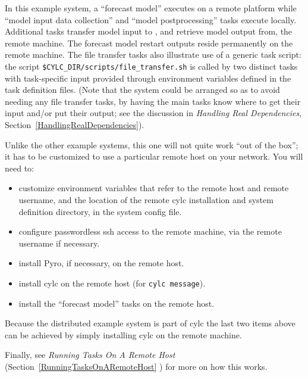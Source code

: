 \documentclass[11pt,a4paper]{article}
\begin{document}
In this example system, a ``forecast model'' executes on a remote
platform while ``model input data collection'' and ``model
postprocessing'' tasks execute locally. Additional tasks transfer model
input to , and retrieve model output from, the remote machine. The
forecast model restart outputs reside permanently on the remote machine.
The file transfer tasks also illustrate use of a generic task script:
the script \lstinline=$CYLC_DIR/scripts/file_transfer.sh= is called by
two distinct tasks with task-specific input provided through environment
variables defined in the task definition files.  (Note that the system
could be arranged so as to avoid needing any file transfer tasks, by
having the main tasks know where to get their input and/or put their
output; see the discussion in {\em Handling Real Dependencies},
Section~\ref{HandlingRealDependencies}).

Unlike the other example systems, this one will not quite work ``out of
the box''; it has to be customized to use a particular remote host on
your network. You will need to:

\begin{itemize}

    \item customize environment variables that refer to the remote 
        host and remote username, and the location of the remote 
        cylc installation and system definition directory, in the system
        config file. 

    \item configure passwordless ssh access to the remote machine,
        via the remote username if necessary.

    \item install Pyro, if necessary, on the remote host.

    \item install cylc on the remote host (for \lstinline=cylc message=).

    \item install the ``forecast model'' tasks on the remote host.

\end{itemize}

Because the distributed example system is part of cylc the last two
items above can be achieved by simply installing cylc on the remote
machine. 

Finally, see {\em Running Tasks On A Remote Host}
(Section~\ref{RunningTasksOnARemoteHost} ) for more on how this works.
\end{document}
